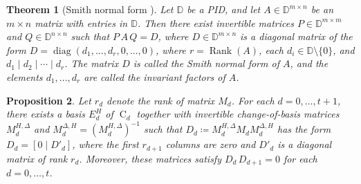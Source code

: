 \documentclass[a4paper,10pt]{article}
\newtheorem{theorem}{Theorem}[section]
\newtheorem{proposition}[theorem]{Proposition}
\newcommand{\bbd}{\mathbb{D}}
\DeclareMathOperator{\rank}{Rank}
\newcommand{\mdh}{M^{\Delta,H}}
\newcommand{\mhd}{M^{H,\Delta}}
\DeclareMathOperator{\Co}{C}
\begin{document}
\begin{theorem}[Smith normal form \cite{jacobson2012basic}]
\label{thm:snf}
Let \(\bbd\) be a PID, and let \(A \in \bbd^{m \times n}\) be an \(m \times n\) matrix with entries in \(\bbd\). Then there exist invertible matrices \(P \in \bbd^{m\times m}\) and \(Q \in \bbd^{n\times n}\) such that \(P\, A \, Q = D\), where \(D \in \bbd^{m \times n}\) is a diagonal matrix of the form \(D = \operatorname{diag}(d_1, \dots, d_r, 0, \dots, 0)\),
where \(r = \rank(A)\), each \(d_i \in \bbd \setminus \{0\}\), and \(d_1 \mid d_2 \mid \cdots \mid d_r\). The matrix \(D\) is called the \emph{Smith normal form of \(A\)}, and the elements \(d_1, \dots, d_r\) are called the \emph{invariant factors of \(A\)}.
\end{theorem}

\begin{proposition} 
\label{prop:diagonals-product-zero} 
Let \(r_d\) denote the rank of matrix \(M_d\). For each \(d=0,\dots,t+1\), there exists a basis \(E^H_d\) of \(\Co_d\) together with invertible change-of-basis matrices \(\mhd_d\) and \(\mdh_d = (\mhd_d)^{-1}\) such that \(D_d \coloneqq \mhd_d M_d \mdh_d\) has the form \(D_d= [0 \mid D'_d]\), where the first \(r_{d+1}\) columns are zero and \(D'_d\) is a diagonal matrix of rank \(r_d\). Moreover, these matrices satisfy \(D_d \, D_{d+1} = 0\) for each \(d=0,\dots,t\). \end{proposition}
\end{document}
